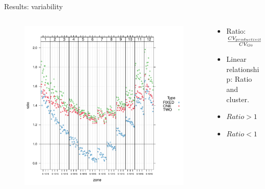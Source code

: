 \documentclass{beamer}%
\begin{document}
\begin{frame}[fragile]{Results: variability}
  \begin{columns}
    \begin{column}{0.6\textwidth}
      \begin{figure}
        \includegraphics[scale=0.4]{dotplot_ratio_zone2.pdf}
      \end{figure}
\end{column}
    \begin{column}{0.5\textwidth}
      \begin{itemize}
      \item Ratio: \begin{math} {CV_{productivity}}\over{CV_{G0}}\end{math}
     \item Linear relationship: Ratio and cluster.  
      \item $Ratio > 1$ %
        \item $Ratio < 1$ %
      \end{itemize}  
    \end{column}
  \end{columns}
\end{frame}
\end{document}
